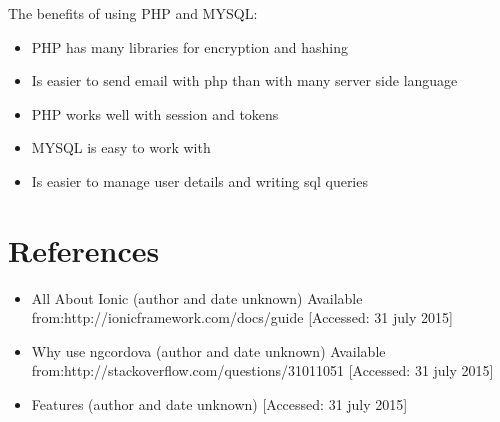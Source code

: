 \documentclass[a4paper,12pt]{article}
\begin{document}
 The benefits of using PHP and MYSQL:
\begin{itemize}
\item PHP has many libraries for encryption and hashing
\item Is easier to send email with php than with many server side language
\item PHP works well with session and tokens
\item MYSQL is easy to work with
\item Is easier to manage user details and writing sql queries 
\end{itemize}

\section{References}
\begin{itemize}
\item All About Ionic (author and date unknown) 
Available from:http://ionicframework.com/docs/guide
[Accessed: 31 july 2015]
\item Why use ngcordova (author and date unknown) 
Available from:http://stackoverflow.com/questions/31011051
[Accessed: 31 july 2015]
\item Features  (author and date unknown) 
[Accessed: 31 july 2015]
\end{itemize}
\end{document}
